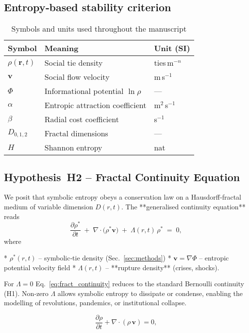 \subsection{Entropy‑based stability criterion}\label{sec:entropy}
\begin{table}[h]
\caption{Symbols and units used throughout the manuscript}
\centering
\begin{tabular}{lll}
\hline
Symbol & Meaning & Unit (SI)\\\hline
$\rho(\mathbf{r},t)$ & Social tie density & ties\,m$^{-n}$\\
$\mathbf{v}$ & Social flow velocity & m\,s$^{-1}$\\
$\Phi$ & Informational potential $\ln\rho$ & —\\
$\alpha$ & Entropic attraction coefficient & m$^{2}$\,s$^{-1}$\\
$\beta$ & Radial cost coefficient & s$^{-1}$\\
$D_{0,1,2}$ & Fractal dimensions & —\\
$H$ & Shannon entropy & nat\\\hline
\end{tabular}
\subsection{Hypothesis H2 – Fractal Continuity Equation}\label{sec:H2}

We posit that symbolic entropy obeys a conservation law on a
Hausdorff‑fractal medium of variable dimension $D(r,t)$.
The **generalised continuity equation** reads
\begin{equation}
\frac{\partial \rho^\ast}{\partial t}\;+\;
\nabla\!\cdot\!\bigl(\rho^\ast \mathbf{v}\bigr)
\;+\;\Lambda(r,t)\,\rho^\ast \;=\; 0 ,
\label{eq:fract_continuity}
\end{equation}
where  

* $\rho^\ast(r,t)$ – symbolic‑tie density (Sec.~\ref{sec:methods})  
* $\mathbf{v}=\nabla\Phi$ – entropic potential velocity field  
* $\Lambda(r,t)$ – **rupture density** (crises, shocks).  

For $\Lambda\!=\!0$ Eq.~\eqref{eq:fract_continuity} reduces to the
standard Bernoulli continuity (H1).  Non‑zero $\Lambda$ allows symbolic
entropy to dissipate or condense, enabling the modelling of revolutions,
pandemics, or institutional collapse.
\label{tab:symbols}
\end{table}
\begin{equation}
\frac{\partial \rho}{\partial t} + \nabla\!\cdot\!(\rho\,\mathbf{v}) = 0 ,
\label{eq:continuity}
\end{equation}

